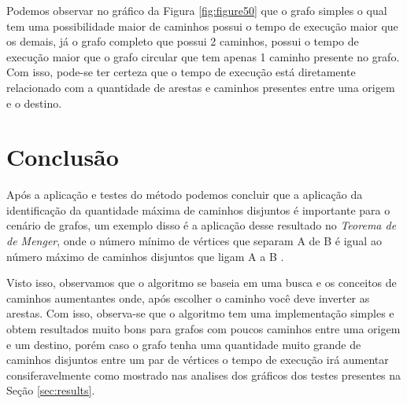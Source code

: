 Podemos observar no gráfico da Figura \ref{fig:figure50} que o grafo simples o qual tem uma possibilidade maior de caminhos possui o tempo de execução maior que os demais, já o grafo completo que possui 2 caminhos, possui o tempo de execução maior que o grafo circular que tem apenas 1 caminho presente no grafo. Com isso, pode-se ter certeza que o tempo de execução está diretamente relacionado com a quantidade de arestas e caminhos presentes entre uma origem e o destino.

\section{Conclusão}
Após a aplicação e testes do método podemos concluir que a aplicação da identificação da quantidade máxima de caminhos disjuntos é importante para o cenário de grafos, um exemplo disso é a aplicação desse resultado no \textit{Teorema de de Menger}, onde o número mínimo de vértices que separam A de B é igual ao número máximo de caminhos disjuntos que ligam A a B \cite{SEYMOUR1980293}.

Visto isso, observamos que o algoritmo se baseia em uma busca e os conceitos de caminhos aumentantes onde, após escolher o caminho você deve inverter as arestas. Com isso, observa-se que o algoritmo tem uma implementação simples e obtem resultados muito bons para grafos com poucos caminhos entre uma origem e um destino, porém caso o grafo tenha uma quantidade muito grande de caminhos disjuntos entre um par de vértices o tempo de execução irá aumentar consiferavelmente como mostrado nas analises dos gráficos dos testes presentes na Seção \ref{sec:results}.